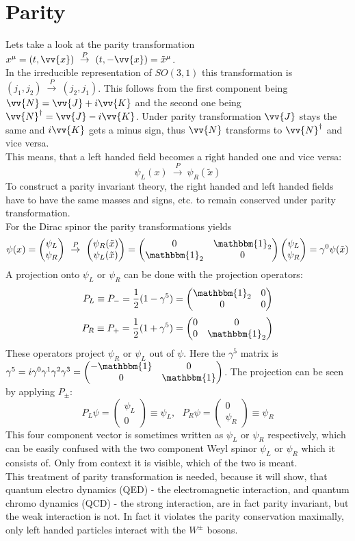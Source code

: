 \documentclass{include/thesisclass}
\newcommand{\vx}{\vv{x}}
\newcommand{\df}{\rightarrow}
\newcommand{\ehm}{\mathbbm{1}}
\newcommand{\vektorz}[2]{\begin{pmatrix} #1 \\ #2 \end{pmatrix}}
\newcommand{\Matz}[4]{\begin{pmatrix}#1&#2\\#3&#4\end{pmatrix}}
\begin{document}
\section{Parity}
Lets take a look at the parity transformation $x^\mu = (t, \vx) ~\overset{P}{\df}~ (t, - \vx) = \tilde{x}^\mu$.\\
In the irreducible representation of $SO(3,1)$ this transformation is $(j_1, j_2)~\overset{P}{\df}~ (j_2, j_1)$. This follows from the first component being $\vv{N} = \vv{J} + i \vv{K}$ and the second one being $\vv{N}^\dagger = \vv{J} - i \vv{K}$. Under parity transformation $\vv{J}$ stays the same and $i\vv{K}$ gets a minus sign, thus $\vv{N}$ transforms to $\vv{N}^\dagger$ and vice versa.\\
This means, that a left handed field becomes a right handed one and vice versa:
\[\psi_L(x) ~\overset{P}{\df}~ \psi_R(\tilde{x})\]
To construct a parity invariant theory, the right handed and left handed fields have to have the same masses and signs, etc. to remain conserved under parity transformation.\\
For the Dirac spinor the parity transformations yields
\[ \psi(x) = \vektorz{\psi_L}{\psi_R} ~\overset{P}{\df}~ \vektorz{\psi_R(\tilde{x})}{\psi_L(\tilde{x})} = \Matz{0}{\ehm_2}{\ehm_2}{0} \vektorz{\psi_L}{\psi_R} = \gamma^0 \psi(\tilde{x})\]
A projection onto $\psi_L$ or $\psi_R$ can be done with the projection operators:
\[ P_L \equiv P_- = \frac{1}{2} ( 1 - \gamma^5) = \Matz{\ehm_2}{0}{0}{0}\]
\[ P_R \equiv P_+ = \frac{1}{2} ( 1 + \gamma^5) = \Matz{0}{0}{0}{\ehm_2}\]
These operators project $\psi_R$ or $\psi_L$ out of $\psi$. Here the $\gamma^5$ matrix is $\gamma^5 = i \gamma^0 \gamma^1\gamma^2\gamma^3 = \Matz{-\ehm}{0}{0}{\ehm}$. The projection can be seen by applying $P_\pm$:
\[P_L\psi = \vektorz{\psi_L}{0} \equiv \psi_L, ~~~ P_R \psi = \vektorz{0}{\psi_R} \equiv \psi_R\]
This four component vector is sometimes written as $\psi_L$ or $\psi_R$ respectively, which can be easily confused with the two component Weyl spinor $\psi_L$ or $\psi_R$ which it consists of. Only from context it is visible, which of the two is meant.\\
This treatment of parity transformation is needed, because it will show, that quantum electro dynamics (QED) - the electromagnetic interaction, and quantum chromo dynamics (QCD) - the strong interaction, are in fact parity invariant, but the weak interaction is not. In fact it violates the parity conservation maximally, only left handed particles interact with the $W^\pm$ bosons.
\end{document}
